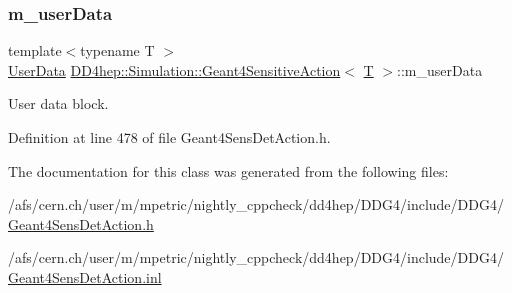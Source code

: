 \hypertarget{class_d_d4hep_1_1_simulation_1_1_geant4_sensitive_action_a0e1c5a4683c5a4e50a0e3325b61f5275}{}\label{class_d_d4hep_1_1_simulation_1_1_geant4_sensitive_action_a0e1c5a4683c5a4e50a0e3325b61f5275} 
\subsubsection{\texorpdfstring{m\+\_\+user\+Data}{m\_userData}}
{\footnotesize\ttfamily template$<$typename T $>$ \\
\hyperlink{class_d_d4hep_1_1_simulation_1_1_geant4_sensitive_action_a1aa349c02363cf7471a043ad5f3b95c9}{User\+Data} \hyperlink{class_d_d4hep_1_1_simulation_1_1_geant4_sensitive_action}{D\+D4hep\+::\+Simulation\+::\+Geant4\+Sensitive\+Action}$<$ \hyperlink{class_t}{T} $>$\+::m\+\_\+user\+Data\hspace{0.3cm}{\ttfamily [protected]}}



User data block. 



Definition at line 478 of file Geant4\+Sens\+Det\+Action.\+h.



The documentation for this class was generated from the following files\+:\begin{DoxyCompactItemize}
\item 
/afs/cern.\+ch/user/m/mpetric/nightly\+\_\+cppcheck/dd4hep/\+D\+D\+G4/include/\+D\+D\+G4/\hyperlink{_geant4_sens_det_action_8h}{Geant4\+Sens\+Det\+Action.\+h}\item 
/afs/cern.\+ch/user/m/mpetric/nightly\+\_\+cppcheck/dd4hep/\+D\+D\+G4/include/\+D\+D\+G4/\hyperlink{_geant4_sens_det_action_8inl}{Geant4\+Sens\+Det\+Action.\+inl}\end{DoxyCompactItemize}
